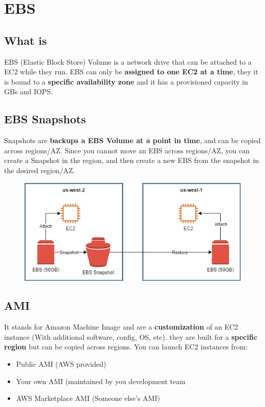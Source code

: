 \section{EBS}\label{sec:ebs}

\subsection{What is}\label{subsec:what-is-ebs}
EBS (Elastic Block Store) Volume is a network drive that can be attached to a EC2 while they run. EBS can only be \textbf{assigned to one EC2 at a time}, they it is bound to a \textbf{specific availability zone} and it has a provisioned capacity in GBs and IOPS.

\subsection{EBS Snapshots}\label{subsec:ebs-snapshots}
Snapshots are \textbf{backups a EBS Volume at a point in time}, and can be copied across regions/AZ. Since you cannot move an EBS across regions/AZ, you can create a Snapshot in the region, and then create a new EBS from the snapshot in the desired region/AZ.

\begin{figure}[h]
\includegraphics[scale=0.5]{ebs/ebs}
\centering\label{fig:ebs}
\end{figure}

\subsection{AMI}\label{subsec:ami}
It stands for Amazon Machine Image and are a \textbf{customization} of an EC2 instance (With additional software, config, OS, etc). they are built for a \textbf{specific region} but can be copied across regions.
You can launch EC2 instances from:
	\begin{itemize}
		\item{Public AMI (AWS provided)}
		\item{Your own AMI (maintained by you development team}
		\item{AWS Marketplace AMI (Someone else's AMI)}
	\end{itemize}

